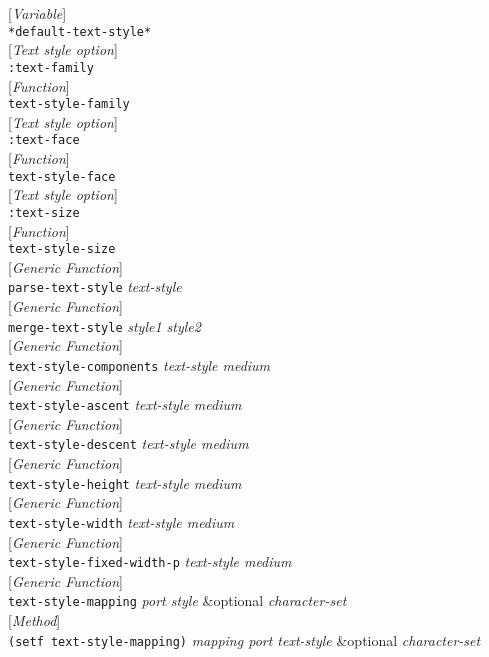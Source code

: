 \documentclass[10pt]{book}
\newenvironment{defother}[2]{[\textit{#1}]\\\texttt{#2}}{\\}
\newenvironment{defun}[1]{\begin{defother}{Function}{#1}}{\end{defother}}
\newenvironment{defgeneric}[1]{\begin{defother}{Generic Function}{#1}}{\end{defother}}
\newenvironment{defmethod}[1]{\begin{defother}{Method}{#1}}{\end{defother}}
\newenvironment{defvar}[1]{\begin{defother}{Variable}{#1}}{\end{defother}}
\begin{document}
\begin{defvar}{*default-text-style*}\end{defvar}
\begin{defother}{Text style option}{:text-family}\end{defother}
\begin{defun}{text-style-family}\end{defun}
\begin{defother}{Text style option}{:text-face}\end{defother}
\begin{defun}{text-style-face}\end{defun}
\begin{defother}{Text style option}{:text-size}\end{defother}
\begin{defun}{text-style-size}\end{defun}
\begin{defgeneric}{parse-text-style} \textit{text-style}\end{defgeneric}
\begin{defgeneric}{merge-text-style} \textit{style1 style2}\end{defgeneric}
\begin{defgeneric}{text-style-components} \textit{text-style medium}\end{defgeneric}
\begin{defgeneric}{text-style-ascent} \textit{text-style medium}\end{defgeneric}
\begin{defgeneric}{text-style-descent} \textit{text-style medium}\end{defgeneric}
\begin{defgeneric}{text-style-height} \textit{text-style medium}\end{defgeneric}
\begin{defgeneric}{text-style-width} \textit{text-style medium}\end{defgeneric}
\begin{defgeneric}{text-style-fixed-width-p} \textit{text-style medium}\end{defgeneric}
\begin{defgeneric}{text-style-mapping} \textit{port style} \&optional \textit{character-set}\end{defgeneric}
\begin{defmethod}{(setf text-style-mapping)} \textit{mapping port text-style} \&optional \textit{character-set}\end{defmethod}
\end{document}
